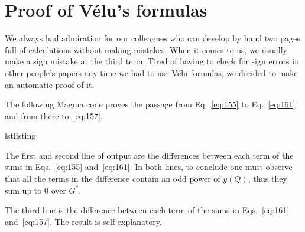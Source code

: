 \chapter{Proof of Vélu's formulas}
\label{cha:proof-velus-formulas}

  We always had admiration for our
colleagues who can develop by hand two pages full of calculations
without making mistakes. When it comes to us, we usually make a sign
mistake at the third term. Tired of having to check for sign errors in
other people's papers any time we had to use Vélu formulas, we decided
to make an automatic proof of it.

The following Magma code proves the passage from Eq.~\eqref{eq:155} to
Eq.~\eqref{eq:161} and from there to~\eqref{eq:157}.

\begin{xcomment}{lstlisting}

\end{xcomment}

The first and second line of output are the differences between each
term of the sums in Eqs.~\eqref{eq:155} and~\eqref{eq:161}. In both
lines, to conclude one must observe that all the terms in the
difference contain an odd power of $y(Q)$, thus they sum up to $0$
over $G^\ast$.

The third line is the difference between each term of the sums in
Eqs.~\eqref{eq:161} and~\eqref{eq:157}. The result is
self-explanatory.


